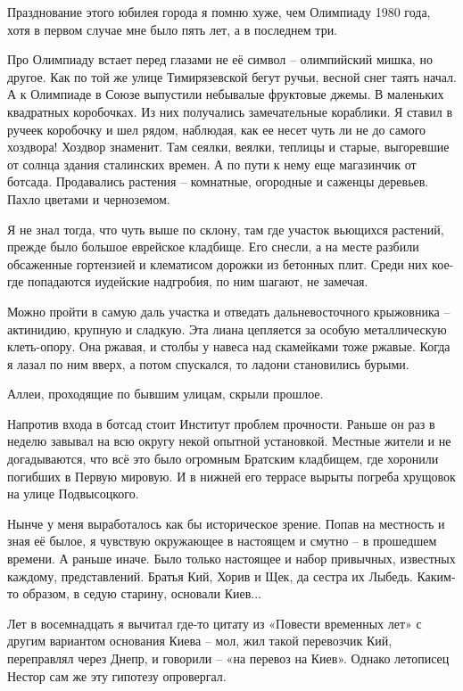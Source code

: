 Празднование этого юбилея города я помню хуже, чем Олимпиаду 1980 года, хотя в первом случае мне было пять лет, а в последнем три. 

Про Олимпиаду встает перед глазами не её символ – олимпийский мишка, но другое. Как по той же улице Тимирязевской бегут ручьи, весной снег таять начал. А к Олимпиаде в Союзе выпустили небывалые фруктовые джемы. В маленьких квадратных коробочках. Из них получались замечательные кораблики. Я ставил в ручеек коробочку и шел рядом, наблюдая, как ее несет чуть ли не до самого хоздвора! Хоздвор знаменит. Там сеялки, веялки, теплицы и старые, выгоревшие от солнца здания сталинских времен. А по пути к нему еще магазинчик от ботсада. Продавались растения – комнатные, огородные и саженцы деревьев. Пахло цветами и черноземом.

Я не знал тогда, что чуть выше по склону, там где участок вьющихся растений, прежде было большое еврейское кладбище. Его снесли, а на месте разбили обсаженные гортензией и клематисом дорожки из бетонных плит. Среди них кое-где попадаются иудейские надгробия, по ним шагают, не замечая.

Можно пройти в самую даль участка и отведать дальневосточного крыжовника – актинидию, крупную и сладкую. Эта лиана цепляется за особую металлическую клеть-опору. Она ржавая, и столбы у навеса над скамейками тоже ржавые. Когда я лазал по ним вверх, а потом спускался, то ладони становились бурыми.

Аллеи, проходящие по бывшим улицам, скрыли прошлое. 

Напротив входа в ботсад стоит Институт проблем прочности. Раньше он раз в неделю завывал на всю округу некой опытной установкой. Местные жители и не догадываются, что всё это было огромным Братским кладбищем, где хоронили погибших в Первую мировую. И в нижней его террасе вырыты погреба хрущовок на улице Подвысоцкого. 

Нынче у меня выработалось как бы историческое зрение. Попав на местность и зная её былое, я чувствую окружающее в настоящем и смутно – в прошедшем времени. А раньше иначе. Было только настоящее и набор привычных, известных каждому, представлений. Братья Кий, Хорив и Щек, да сестра их Лыбедь. Каким-то образом, в седую старину, основали Киев...

Лет в восемнадцать я вычитал где-то цитату из «Повести временных лет» с другим вариантом основания Киева – мол, жил такой перевозчик Кий, переправлял через Днепр, и говорили – «на перевоз на Киев». Однако летописец Нестор сам же эту гипотезу опровергал.

